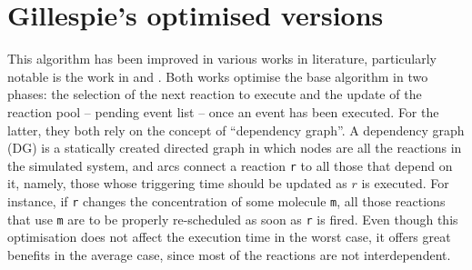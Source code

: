\documentclass[12pt,a4paper,twoside,openright]{book}
\begin{document}
\section{Gillespie's optimised versions}
This algorithm has been improved in various works in literature, particularly notable is the work in \cite{gibson2000} and \cite{slepoy2008}.
%
Both works optimise the base algorithm in two phases: the selection of the next reaction to execute and the update of the reaction pool -- pending event list -- once an event has been executed.
%
For the latter, they both rely on the concept of ``dependency graph''.
%
A dependency graph (DG) is a statically created directed graph in which nodes are all the reactions in the simulated system, and arcs connect a reaction \texttt{r} to all those that depend on it, namely, those whose triggering time should be updated as $r$ is executed.
%
For instance, if \texttt{r} changes the concentration of some molecule \texttt{m}, all those reactions that use \texttt{m} are to be properly re-scheduled as soon as \texttt{r} is fired.
%
Even though this optimisation does not affect the execution time in the worst case, it offers great benefits in the average case, since most of the reactions are not interdependent.
\end{document}
